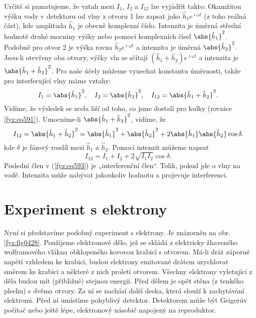     Určitě si pamatujeme, že vztah mezi \(I_{1}\), \(I_{2}\) a \(I_{12}\)  lze vyjádřit takto:
    Okamžitou výšku vody v detektoru od vlny z otvoru 1 lze zapsat jako \(\hat{h}_1e^{\imath\omega
    t}\) (z toho reálná část), kde amplituda \(\hat{h}_1\) je obecně komplexní číslo. Intenzita je
    úměrná střední hodnotě druhé mocniny výšky nebo pomocí komplexních čísel \(\abs{\hat{h}_1}^2\).
    Podobně pro otvor 2 je výška rovna \(\hat{h}_2e^{\imath\omega t}\)  a intenzita je úměrná
    \(\abs{\hat{h}_2}^2\). Jsou-li otevřeny oba otvory, výšky vln se sčítají \((\hat{h}_1 +
    \hat{h}_2)e^{\imath\omega t}\)  a intenzita je \(\abs{\hat{h}_1 + \hat{h}_2}^2\). Pro naše účely
    můžeme vynechat konstantu úměrnosti, takže pro interferující vlny máme vztahy:
    \begin{equation}\label{fyz:eq592}
      I_1 = \abs{\hat{h}_1}^2, \quad I_2 = \abs{\hat{h}_2}^2, \quad 
      I_{12} = \abs{\hat{h}_1 + \hat{h}_2}^2.
    \end{equation}
    Vidíme, že výsledek se zcela liší od toho, co jsme dostali pro kulky (rovnice \ref{fyz:eq591}).
    Umocníme-li \(\abs{\hat{h}_1 + \hat{h}_2}^2\), vidíme, že
    \begin{equation*}
      I_{12} = \abs{\hat{h}_1 + \hat{h}_2}^2 
             = \abs{\hat{h}_1}^2 + \abs{\hat{h}_2}^2 + 2\abs{\hat{h}_1}\abs{\hat{h}_2}\cos\delta.
    \end{equation*}
    kde \(\delta\) je fázový rozdíl mezi \(\hat{h}_1\) a \(\hat{h}_2\). Pomocí intenzit můžeme
    napsat
    \begin{equation}\label{fyz:eq593}
      I_{12} = I_1 + I_2 + 2\sqrt{I_1I_2}\cos\delta.
    \end{equation}
    Poslední člen v (\ref{fyz:eq593}) je „interferenční člen“. Tolik, pokud jde o vlny na vodě.
    Intenzita může nabývat jakoukoliv hodnotu a projevuje interferenci.

  \section{Experiment s elektrony}\label{fyz:IchapXXXVIIsecIV}
    Nyní si představíme podobný experiment s elektrony. Je znázorněn na obr. \ref{fyz:fig0428}.
    Použijeme elektronové dělo, jež se skládá z elektricky žhaveného wolframového vlákna obklopeného
    kovovou krabicí s otvorem. Má-li drát záporné napětí vzhledem ke krabici, budou elektrony
    emitované drátem urychlovat směrem ke krabici a některé z nich proletí otvorem. Všechny elektrony
    vyletující z děla budou mít (přibližně) stejnou energii. Před dělem je opět stěna (z tenkého
    plechu) s dvěma otvory. Za ní se nachází další deska, která slouží k zachytávání elektronů. Před
    ní umístíme pohyblivý detektor. Detektorem může být Geigerův počítač nebo ještě lépe, elektronový
    násobič napojený na reproduktor.

